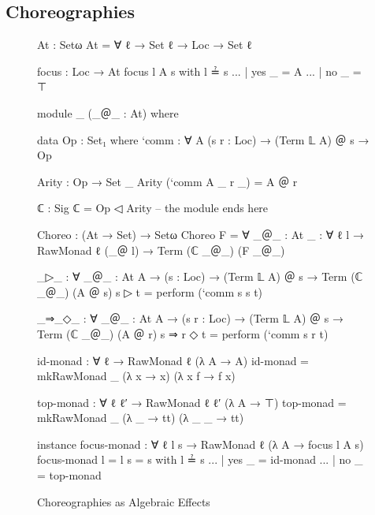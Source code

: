 \subsection{Choreographies}
\label{sec:choreo}

\begin{figure}[ht]

\begin{minipage}{.45\textwidth}
  \begin{center}\begin{code}
At : Setω
At = ∀ {ℓ} → Set ℓ → Loc → Set ℓ

focus : Loc → At
focus l A s with l ≟ s
... | yes _  = A
... | no  _  = ⊤

module _ (_＠_ : At) where

  data Op : Set₁ where
    `comm :  ∀ {A} (s r : Loc) →
             (Term 𝕃 A) ＠ s → Op

  Arity : Op → Set _
  Arity (`comm {A} _ r _) = A ＠ r

  ℂ : Sig
  ℂ = Op ◁ Arity
  -- the module ends here
  \end{code}\end{center}
\end{minipage}
\hfill\vline\hfill
\begin{minipage}{.45\textwidth}
  \begin{center}\begin{code}
Choreo : (At → Set) → Setω
Choreo F =
  ∀ {_＠_ : At}
  {{_ : ∀ {ℓ} {l} → RawMonad {ℓ} (_＠ l)}} →
  Term (ℂ _＠_) (F _＠_)

_▷_ :  ∀ {_＠_ : At} {A} →
       (s : Loc) → (Term 𝕃 A) ＠ s →
       Term (ℂ _＠_) (A ＠ s)
s ▷ t = perform (`comm s s t)

_⇒_◇_ :  ∀ {_＠_ : At} {A} →
         (s r : Loc) → (Term 𝕃 A) ＠ s →
         Term (ℂ _＠_) (A ＠ r)
s ⇒ r ◇ t = perform (`comm s r t)
  \end{code}\end{center}
\end{minipage}

\begin{code}[hide]
id-monad : ∀ {ℓ} → RawMonad {ℓ} (λ A → A)
id-monad = mkRawMonad _ (λ x → x) (λ x f → f x)

top-monad : ∀ {ℓ ℓ′} → RawMonad {ℓ} {ℓ′} (λ A → ⊤)
top-monad = mkRawMonad _ (λ _ → tt) (λ _ _ → tt)

instance
  focus-monad : ∀ {ℓ} {l s} → RawMonad {ℓ} (λ A → focus l A s)
  focus-monad {l = l} {s = s} with l ≟ s
  ... | yes _ = id-monad
  ... | no  _ = top-monad
\end{code}

\caption{Choreographies as Algebraic Effects}
\label{fig:choreo}
\end{figure}

